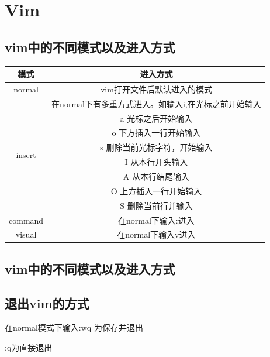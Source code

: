 \documentclass[UTF8,a4paper]{ctexart}
\begin{document}
\section{Vim}
\subsection{vim中的不同模式以及进入方式}
\begin{tabular}{c|c}
    
    模式 & 进入方式\\
    \hline
    normal & vim打开文件后默认进入的模式\\
    \hline
    \multirow{8}{*}{insert} & 在normal下有多重方式进入。如输入i,在光标之前开始输入\\ 
    & a 光标之后开始输入\\ 
    & o 下方插入一行开始输入\\
    & s 删除当前光标字符，开始输入\\
    & I 从本行开头输入\\
    & A 从本行结尾输入\\
    & O 上方插入一行开始输入\\
    & S 删除当前行并输入\\ 
    \hline
    command & 在normal下输入:进入\\
    \hline
    visual & 在normal下输入v进入\\
\end{tabular}

\subsection{vim中的不同模式以及进入方式}
\subsection{退出vim的方式}
在normal模式下输入:wq 为保存并退出\par
:q为直接退出
\end{document}
